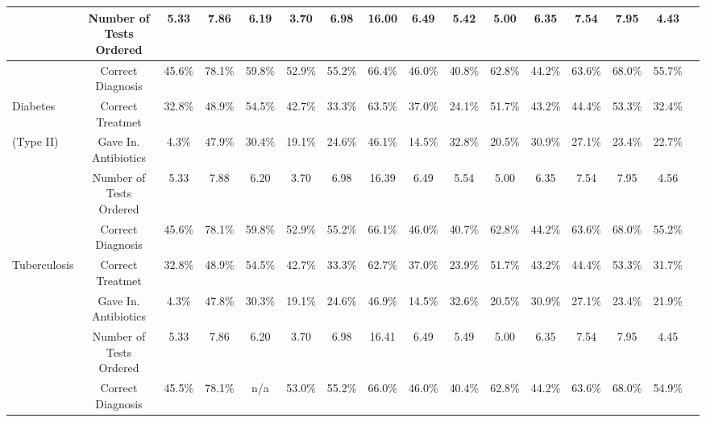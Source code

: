\begin{tabular}{l*{15}{c}}
 &                                     {Number of Tests Ordered}&  {5.33}&    {7.86}&    {6.19}&    {3.70}&        {6.98}&        {16.00}&        {6.49}&        {5.42}&        {5.00}&        {6.35}&       {7.54}&       {7.95}&       {4.43}\\
\hline
 &                                     {Correct Diagnosis}&            {45.6\%}&      {78.1\%}&  {59.8\%}&  {52.9\%}&      {55.2\%}&      {66.4\%}&      {46.0\%}&      {40.8\%}&      {62.8\%}&      {44.2\%}&     {63.6\%}&     {68.0\%}&     {55.7\%}\\
Diabetes&                      {Correct Treatmet}&             {32.8\%}&      {48.9\%}&  {54.5\%}&  {42.7\%}&      {33.3\%}&      {63.5\%}&      {37.0\%}&      {24.1\%}&      {51.7\%}&      {43.2\%}&     {44.4\%}&     {53.3\%}&     {32.4\%}\\
(Type II)&                     {Gave In. Antibiotics}&         {4.3\%}&      {47.9\%}&  {30.4\%}&  {19.1\%}&      {24.6\%}&      {46.1\%}&      {14.5\%}&      {32.8\%}&      {20.5\%}&      {30.9\%}&     {27.1\%}&     {23.4\%}&     {22.7\%}\\
 &                                     {Number of Tests Ordered}&  {5.33}&    {7.88}&    {6.20}&    {3.70}&        {6.98}&        {16.39}&        {6.49}&        {5.54}&        {5.00}&        {6.35}&       {7.54}&       {7.95}&       {4.56}\\
\hline
 &                                     {Correct Diagnosis}&            {45.6\%}&      {78.1\%}&  {59.8\%}&  {52.9\%}&      {55.2\%}&      {66.1\%}&      {46.0\%}&      {40.7\%}&      {62.8\%}&      {44.2\%}&     {63.6\%}&     {68.0\%}&     {55.2\%}\\
Tuberculosis&          {Correct Treatmet}&             {32.8\%}&      {48.9\%}&  {54.5\%}&  {42.7\%}&      {33.3\%}&      {62.7\%}&      {37.0\%}&      {23.9\%}&      {51.7\%}&      {43.2\%}&     {44.4\%}&     {53.3\%}&     {31.7\%}\\
 &                                     {Gave In. Antibiotics}&         {4.3\%}&      {47.8\%}&  {30.3\%}&  {19.1\%}&      {24.6\%}&      {46.9\%}&      {14.5\%}&      {32.6\%}&      {20.5\%}&      {30.9\%}&     {27.1\%}&     {23.4\%}&     {21.9\%}\\
 &                                     {Number of Tests Ordered}&  {5.33}&    {7.86}&    {6.20}&    {3.70}&        {6.98}&        {16.41}&        {6.49}&        {5.49}&        {5.00}&        {6.35}&       {7.54}&       {7.95}&       {4.45}\\
\hline
 &                                     {Correct Diagnosis}&            {45.5\%}&      {78.1\%}&  {n/a}&      {53.0\%}&      {55.2\%}&      {66.0\%}&      {46.0\%}&      {40.4\%}&      {62.8\%}&      {44.2\%}&     {63.6\%}&     {68.0\%}&     {54.9\%}\\

\end{tabular}
